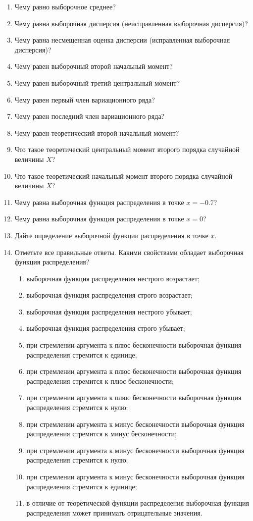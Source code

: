 \documentclass[12pt]{article}
\begin{document}
\begin{enumerate}
\item Чему равно выборочное среднее?
\item Чему равна выборочная дисперсия (неисправленная выборочная дисперсия)?
\item Чему равна несмещенная оценка дисперсии (исправленная выборочная дисперсия)?
\item Чему равен выборочный второй начальный момент?
\item Чему равен выборочный третий центральный момент?
\item Чему равен первый член вариационного ряда?
\item Чему равен последний член вариационного ряда?
\item Чему равен теоретический второй начальный момент?
\item Что такое теоретический центральный момент второго порядка случайной величины $X$?
\item Что такое теоретический начальный момент второго порядка случайной величины $X$?
\item Чему равна выборочная функция распределения в точке $x = -0.7$?
\item Чему равна выборочная функция распределения в точке $x = 0$?
\item Дайте определение выборочной функции распределения в точке $x$.
\item Отметьте все правильные ответы. Какими свойствами обладает выборочная функция распределения?
\begin{enumerate}
\item выборочная функция распределения нестрого возрастает;
\item выборочная функция распределения строго возрастает;
\item выборочная функция распределения нестрого убывает;
\item выборочная функция распределения строго убывает;
\item при стремлении аргумента к плюс бесконечности выборочная функция распределения стремится к единице;
\item при стремлении аргумента к плюс бесконечности выборочная функция распределения стремится к плюс бесконечности;
\item при стремлении аргумента к плюс бесконечности выборочная функция распределения стремится к нулю;
\item при стремлении аргумента к минус бесконечности выборочная функция распределения стремится к минус бесконечности;
\item при стремлении аргумента к минус бесконечности выборочная функция распределения стремится к нулю;
\item при стремлении аргумента к минус бесконечности выборочная функция распределения стремится к единице;
\item в отличие от теоретической функции распределения выборочная функция распределения может принимать отрицательные значения.
\end{enumerate}

\end{enumerate}
\end{document}
